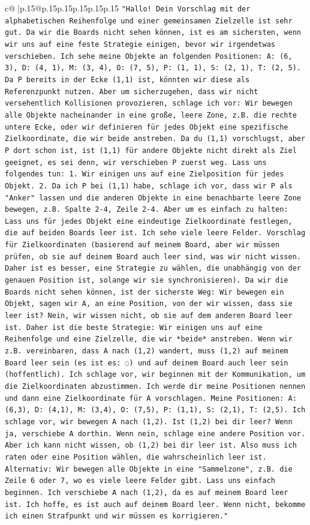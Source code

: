 \documentclass{article}
\begin{document}
{\begin{supertabular}{c@{$\;$}|p{.15\linewidth}@{}p{.15\linewidth}p{.15\linewidth}p{.15\linewidth}p{.15\linewidth}p{.15\linewidth}}
{{{\texttt{"Hallo! Dein Vorschlag mit der alphabetischen Reihenfolge und einer gemeinsamen Zielzelle ist sehr gut. Da wir die Boards nicht sehen können, ist es am sichersten, wenn wir uns auf eine feste Strategie einigen, bevor wir irgendetwas verschieben. Ich sehe meine Objekte an folgenden Positionen: A: (6, 3), D: (4, 1), M: (3, 4), O: (7, 5), P: (1, 1), S: (2, 1), T: (2, 5). Da P bereits in der Ecke (1,1) ist, könnten wir diese als Referenzpunkt nutzen. Aber um sicherzugehen, dass wir nicht versehentlich Kollisionen provozieren, schlage ich vor: Wir bewegen alle Objekte nacheinander in eine große, leere Zone, z.B. die rechte untere Ecke, oder wir definieren für jedes Objekt eine spezifische Zielkoordinate, die wir beide anstreben. Da du (1,1) vorschlugst, aber P dort schon ist, ist (1,1) für andere Objekte nicht direkt als Ziel geeignet, es sei denn, wir verschieben P zuerst weg. Lass uns folgendes tun: 1. Wir einigen uns auf eine Zielposition für jedes Objekt. 2. Da ich P bei (1,1) habe, schlage ich vor, dass wir P als "Anker" lassen und die anderen Objekte in eine benachbarte leere Zone bewegen, z.B. Spalte 2{-}4, Zeile 2{-}4. Aber um es einfach zu halten: Lass uns für jedes Objekt eine eindeutige Zielkoordinate festlegen, die auf beiden Boards leer ist. Ich sehe viele leere Felder. Vorschlag für Zielkoordinaten (basierend auf meinem Board, aber wir müssen prüfen, ob sie auf deinem Board auch leer sind, was wir nicht wissen. Daher ist es besser, eine Strategie zu wählen, die unabhängig von der genauen Position ist, solange wir sie synchronisieren). Da wir die Boards nicht sehen können, ist der sicherste Weg: Wir bewegen ein Objekt, sagen wir A, an eine Position, von der wir wissen, dass sie leer ist? Nein, wir wissen nicht, ob sie auf dem anderen Board leer ist. Daher ist die beste Strategie: Wir einigen uns auf eine Reihenfolge und eine Zielzelle, die wir *beide* anstreben. Wenn wir z.B. vereinbaren, dass A nach (1,2) wandert, muss (1,2) auf meinem Board leer sein (es ist es: ◌) und auf deinem Board auch leer sein (hoffentlich). Ich schlage vor, wir beginnen mit der Kommunikation, um die Zielkoordinaten abzustimmen. Ich werde dir meine Positionen nennen und dann eine Zielkoordinate für A vorschlagen. Meine Positionen: A: (6,3), D: (4,1), M: (3,4), O: (7,5), P: (1,1), S: (2,1), T: (2,5). Ich schlage vor, wir bewegen A nach (1,2). Ist (1,2) bei dir leer? Wenn ja, verschiebe A dorthin. Wenn nein, schlage eine andere Position vor. Aber ich kann nicht wissen, ob (1,2) bei dir leer ist. Also muss ich raten oder eine Position wählen, die wahrscheinlich leer ist. Alternativ: Wir bewegen alle Objekte in eine "Sammelzone", z.B. die Zeile 6 oder 7, wo es viele leere Felder gibt. Lass uns einfach beginnen. Ich verschiebe A nach (1,2), da es auf meinem Board leer ist. Ich hoffe, es ist auch auf deinem Board leer. Wenn nicht, bekomme ich einen Strafpunkt und wir müssen es korrigieren."} \\
}}}
\end{supertabular}}
\end{document}
